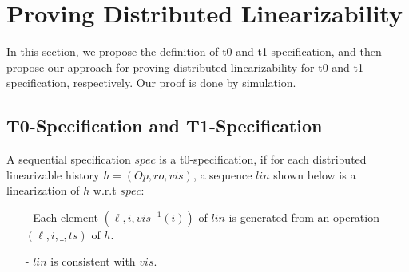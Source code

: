 
\section{Proving Distributed Linearizability}
\label{sec:proving distributed linearizability}

In this section, we propose the definition of t0 and t1 specification, and then propose our approach for proving distributed linearizability for t0 and t1 specification, respectively. Our proof is done by simulation.



\subsection{T0-Specification and T1-Specification}
\label{subsec:t0 specification and t1 specification}



\begin{definition}[t0-specification]
\label{definition:t0-specification}
A sequential specification $\mathit{spec}$ is a t0-specification, if for each distributed linearizable history $h=(\mathit{Op},\mathit{ro},\mathit{vis})$, a sequence $\mathit{lin}$ shown below is a linearization of $h$ w.r.t $\mathit{spec}$: 

\begin{itemize}
\setlength{\itemsep}{0.5pt}
\item[-] Each element $(\ell,i,\mathit{vis}^{-1}(i))$ of $\mathit{lin}$ is generated from an operation $(\ell,i,\_,\mathit{ts})$ of $h$.

\item[-] $\mathit{lin}$ is consistent with $\mathit{vis}$. 
\end{itemize}


\end{definition}

